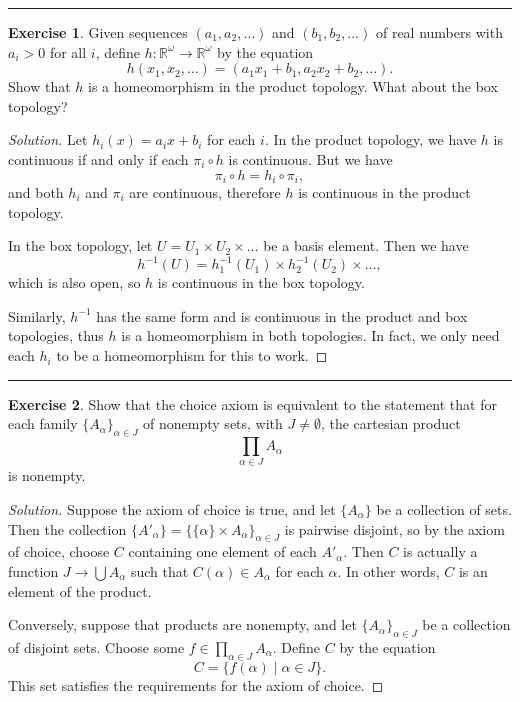 \documentclass{article}
\theoremstyle{definition}
\newtheorem{exercise}{Exercise}[section]
\begin{document}
\hrule

\begin{exercise}
  Given sequences $(a_1,a_2,\dots)$ and $(b_1,b_2,\dots)$ of real numbers with $a_i > 0$ for all $i$,
  define $h:\mathbb{R}^\omega\to\mathbb{R}^\omega$ by the equation
  $$h(x_1,x_2,\dots) = (a_1x_1+b_1,a_2x_2+b_2,\dots).$$
  Show that $h$ is a homeomorphism in the product topology. What about the box topology?
\end{exercise}
\begin{proof}[Solution]
  Let $h_i(x) = a_ix + b_i$ for each $i$. In the product topology, we have $h$ is continuous if and only if each $\pi_i\circ h$ is continuous. But we have
  $$\pi_i\circ h = h_i\circ\pi_i,$$
  and both $h_i$ and $\pi_i$ are continuous, therefore $h$ is continuous in the product topology.

  In the box topology, let $U = U_1\times U_2\times\dots$ be a basis element. Then we have
  $$h^{-1}(U) = h_1^{-1}(U_1)\times h_2^{-1}(U_2)\times\dots,$$
  which is also open, so $h$ is continuous in the box topology.

  Similarly, $h^{-1}$ has the same form and is continuous in the product and box topologies, thus $h$ is a homeomorphism in both topologies. In fact, we only need each $h_i$ to be a homeomorphism for this to work.
\end{proof}

\hrule

\begin{exercise}
  Show that the choice axiom is equivalent to the statement that for each family $\{A_\alpha\}_{\alpha\in J}$ of nonempty sets, with $J\ne\emptyset$, the cartesian product
  $$\prod_{\alpha\in J} A_\alpha$$
  is nonempty.
\end{exercise}
\begin{proof}[Solution]
  Suppose the axiom of choice is true, and let $\{A_\alpha\}$ be a collection of sets. Then the collection $\{A'_\alpha\} = \{\{\alpha\}\times A_\alpha\}_{\alpha\in J}$ is pairwise disjoint, so by the axiom of choice, choose $C$ containing one element of each $A'_\alpha$. Then $C$ is actually a function $J\to\bigcup A_\alpha$ such that $C(\alpha)\in A_\alpha$ for each $\alpha$. In other words, $C$ is an element of the product.

  Conversely, suppose that products are nonempty, and let $\{A_\alpha\}_{\alpha\in J}$ be a collection of disjoint sets. Choose some $f\in\prod_{\alpha\in J}A_\alpha$. Define $C$ by the equation
  $$C = \{f(\alpha)\mid \alpha\in J\}.$$
  This set satisfies the requirements for the axiom of choice.
\end{proof}
\end{document}
